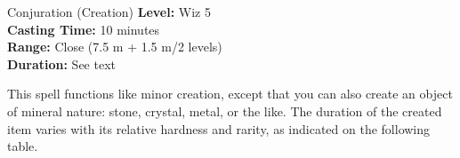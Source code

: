 {Conjuration (Creation)}
{
	\textbf{Level:}
	Wiz 5\\
	\textbf{Casting Time:}
	10 minutes\\
	\textbf{Range:}
	Close (7.5 m + 1.5 m/2 levels)\\
	\textbf{Duration:}
	See text\\
}
{
	This spell functions like minor creation, except that you can also create an object of mineral nature: stone, crystal, metal, or the like. The duration of the created item varies with its relative hardness and rarity, as indicated on the following table.


}
